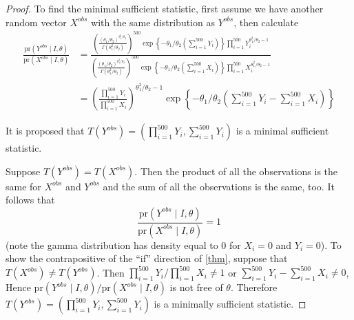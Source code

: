 \documentclass[letterpaper, 12pt]{article}
\newcommand{\pr}{\text{pr}}
\newcommand{\sbs}{\;|\;} %
\begin{document}
\begin{enumerate}[(i)]
\begin{proof}
To find the minimal sufficient statistic, first assume we have another random vector $X^{obs}$ with the same distribution as $Y^{obs}$, then calculate
\begin{align}
\frac{\pr(Y^{obs} \sbs I, \theta)}{\pr(X^{obs} \sbs I, \theta)} 
&=
\frac
{
\left(
\frac{(\theta_1 / \theta_2)^{\theta_1^2 / \theta_2}}{\Gamma(\theta_1^2 / \theta_2)}
\right)^{500}
\exp
\left\{
-\theta_1/\theta_2
\left(
\sum_{i=1}^{500}
Y_i
\right)
\right\}
\prod_{i=1}^{500} 
Y_i^{\theta_1^2 / \theta_2 - 1}
}
{
\left(
\frac{(\theta_1 / \theta_2)^{\theta_1^2 / \theta_2}}{\Gamma(\theta_1^2 / \theta_2) }
\right)^{500}
\exp
\left\{
-\theta_1/\theta_2
\left(
\sum_{i=1}^{500}
X_i
\right)
\right\}
\prod_{i=1}^{500} 
X_i^{\theta_1^2 / \theta_2 - 1}
}
\\
&= \left( 
\frac{\prod_{i=1}^{500} Y_i}
{\prod_{i=1}^{500} X_i}
\right)^{\theta_1^2 /\theta_2 - 1} 
\exp
\left\{
-\theta_1 /\theta_2
\left(
\sum_{i=1}^{500}Y_i - \sum_{i=1}^{500}X_i
\right)
\right\}
\end{align}

It is proposed that $T(Y^{obs})=(\prod_{i=1}^{500} Y_i, \sum_{i=1}^{500}Y_i)$ is a minimal sufficient statistic.

Suppose $T(Y^{obs})= T(X^{obs})$. 
Then the product of all the observations is the same for $X^{obs}$ and $Y^{obs}$ and the sum of all the observations is the same, too. 
It follows that 
\begin{equation}
\frac{\pr(Y^{obs} \sbs I, \theta)}{\pr(X^{obs} \sbs I, \theta)} = 1
\end{equation}
(note the gamma distribution has density equal to $0$ for $X_i = 0$ and $Y_i = 0$).
To show the contrapositive of the ``if'' direction of
\eqref{thm},
suppose 
that $T(X^{obs}) \neq T(Y^{obs})$. Then
$\prod_{i=1}^{500} Y_i/ \prod_{i=1}^{500}X_i \neq 1$ or $\sum_{i=1}^{500}Y_i - \sum_{i=1}^{500}X_i \neq 0$, Hence
$\pr(Y^{obs} \sbs I, \theta)/\pr(X^{obs} \sbs I, \theta)$ is not free of $\theta$. 
Therefore $T(Y^{obs})=(\prod_{i=1}^{500} Y_i, \sum_{i=1}^{500}Y_i)$ is a minimally sufficient statistic.


\end{proof}
\end{enumerate}
\end{document}
